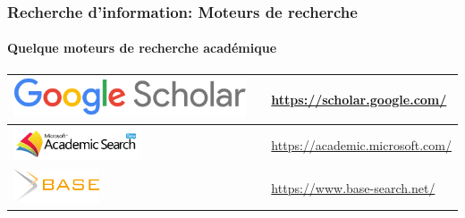 \documentclass{beamer}
\begin{document}
\begin{frame}
\frametitle{Recherche d'information: Moteurs de recherche}
\framesubtitle{Quelque moteurs de recherche académique}

%	
%	

\def\arraystretch{0}
\begin{tabular}{L{.3\textwidth}{1cm}cp{.6\textwidth}}%
	
	\hline
	
	\includegraphics[height=.6cm]{..//img/Bweb02-ri-gmail/gscholar-logo.png} &
	&
	\url{https://scholar.google.com/} \\
	
	\hline
	
	\includegraphics[height=1cm]{..//img/Bweb02-ri-gmail/msacademic-logo.png} &
	& 
	\url{https://academic.microsoft.com/}  \\
	
	\hline
	
	\includegraphics[height=1cm]{..//img/Bweb02-ri-gmail/base-logo.png} &
	& 
	\url{https://www.base-search.net/} \\
	
	\hline
	

\end{tabular}
\end{frame}
\end{document}
